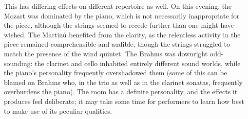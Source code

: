 This has differing effects on different repertoire as well. On this evening, the Mozart was dominated by the piano, which is not necessarily inappropriate for the piece, although the strings seemed to recede further than one might have wished. The Martinů benefited from the clarity, as the relentless activity in the piece remained comprehensible and audible, though the strings struggled to match the presence of the wind quintet. The Brahms was downright odd-sounding: the clarinet and cello inhabited entirely different sound worlds, while the piano’s personality frequently overshadowed them (some of this can be blamed on Brahms who, in the trio as well as in the clarinet sonatas, frequently overburdens the piano). The room has a definite personality, and the effects it produces feel deliberate; it may take some time for performers to learn how best to make use of its peculiar qualities.
